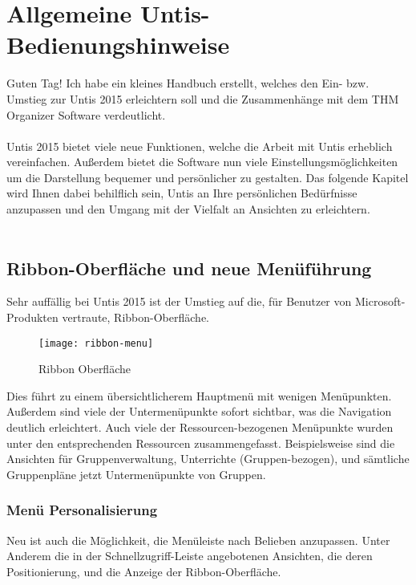 
\chapter{Allgemeine Untis-Bedienungshinweise}

Guten Tag! Ich habe ein kleines Handbuch erstellt, welches den Ein- bzw. Umstieg zur Untis 2015 erleichtern soll und die Zusammenhänge mit dem THM Organizer Software verdeutlicht.\\
\\
Untis 2015 bietet viele neue Funktionen, welche die Arbeit mit Untis erheblich vereinfachen. Außerdem bietet die Software nun viele Einstellungsmöglichkeiten um die Darstellung bequemer und persönlicher zu gestalten. Das folgende Kapitel wird Ihnen dabei behilflich sein, Untis an Ihre persönlichen Bedürfnisse anzupassen und den Umgang mit der Vielfalt an Ansichten zu erleichtern.\\
\\

\section{Ribbon-Oberfläche und neue Menüführung}

Sehr auffällig bei Untis 2015 ist der Umstieg auf die, für Benutzer von Microsoft-Produkten vertraute, Ribbon-Oberfläche. 

\begin{figure}[h]
	\texttt{[image: ribbon-menu]}
	\vspace{-15pt}
	\caption{Ribbon Oberfläche}
	\label{fig:ribbon}
\end{figure}

\noindent
Dies führt zu einem übersichtlicherem Hauptmenü mit wenigen Menüpunkten. Außerdem sind viele der Untermenüpunkte sofort sichtbar, was die Navigation deutlich erleichtert. Auch viele der Ressourcen-bezogenen Menüpunkte wurden unter den entsprechenden Ressourcen zusammengefasst. Beispielsweise sind die Ansichten für Gruppenverwaltung, Unterrichte (Gruppen-bezogen), und sämtliche Gruppenpläne jetzt Untermenüpunkte von Gruppen.  

\subsection{Menü Personalisierung}

Neu ist auch die Möglichkeit, die Menüleiste nach Belieben anzupassen. Unter Anderem die in der Schnellzugriff-Leiste angebotenen Ansichten, die deren Positionierung, und die Anzeige der Ribbon-Oberfläche.\\


